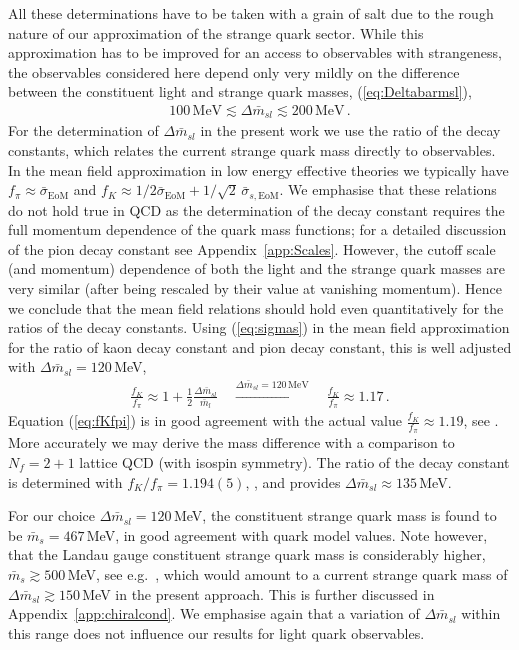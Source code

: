 \documentclass[%
reprint,
superscriptaddress,
showpacs,preprintnumbers,
 amsmath,amssymb,
 aps,
prd,
]{revtex4-1}
\def\Eq#1{Equation (\ref{#1})}
\def\eq#1{(\ref{#1})}
\def\app#1{Appendix~\ref{#1}}
\begin{document}
All these determinations have to be taken with a grain of salt due to
the rough nature of our approximation of the strange quark
sector. While this approximation has to be improved for an access to
observables with strangeness, the observables considered here depend
only very mildly on the difference between the constituent light and
strange quark masses, \eq{eq:Deltabarmsl},
%
\begin{align}\label{eq:barms-range}
  100\,\textrm{MeV} \lesssim \Delta\bar m_{sl}\lesssim 200\, \textrm{MeV}\,.
\end{align}
%
For the determination of $\Delta\bar m_{sl}$ in the present work we
use the ratio of the decay constants, which relates the current
strange quark mass directly to observables. In the mean field
approximation in low energy effective theories we typically have
$f_\pi\approx \bar\sigma_\textrm{EoM}$ and
$f_K\approx 1/2 \bar \sigma_\textrm{EoM}
+1/\sqrt{2}\,\bar\sigma_{s,\textrm{EoM}}$. We emphasise that these
relations do not hold true in QCD as the determination of the decay
constant requires the full momentum dependence of the quark mass
functions; for a detailed discussion of the pion decay constant see
\app{app:Scales}.  However, the cutoff scale (and momentum) dependence
of both the light and the strange quark masses are very similar (after
being rescaled by their value at vanishing momentum). Hence we
conclude that the mean field relations should hold even
quantitatively for the ratios of the decay constants. Using
\eq{eq:sigmas} in the mean field approximation for the ratio of kaon
decay constant and pion decay constant, this is well adjusted with
$\Delta \bar m_{sl}=120$\,MeV,
%
\begin{align}\label{eq:fKfpi}
  \frac{f_K}{f_\pi} \approx
  1+ \frac12 \frac{\Delta \bar m_{sl}}{\bar m_l}
  \quad \stackrel{\Delta
  \bar m_{sl}=120\,\textrm{MeV}}
  {\longrightarrow}
  \quad 
  \frac{f_K}{f_\pi } \approx 1.17\,.
\end{align}
%
\Eq{eq:fKfpi} is in good agreement with the actual value
$\frac{f_K}{f_\pi } \approx 1.19$, see \cite{Tanabashi:2018oca}. More
accurately we may derive the mass difference with a comparison to
$N_f=2+1$ lattice QCD (with isospin symmetry). The ratio of the decay
constant is determined with $f_K/f_\pi = 1.194(5)$,
\cite{Aoki:2013ldr}, and provides $\Delta\bar m_{sl}\approx 135$\,MeV.


For our choice $\Delta \bar m_{sl}=120$\,MeV, the constituent strange
quark mass is found to be $\bar m_s = 467$\,MeV, in good agreement
with quark model values. Note however, that the Landau gauge
constituent strange quark mass is considerably higher,
$\bar m_s \gtrsim 500$\,MeV, see e.g.\ \cite{Fischer:2018sdj}, which
would amount to a current strange quark mass of
$\Delta \bar m_{sl} \gtrsim 150$\,MeV in the present approach. This is
further discussed in \app{app:chiralcond}. We emphasise again that a
variation of $\Delta \bar m_{sl}$ within this range does not influence
our results for light quark observables.
 
\end{document}
